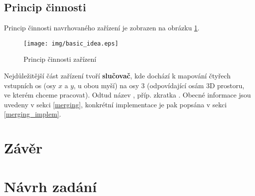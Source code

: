 \documentclass[a4paper,12pt,titlepage]{article}
\begin{document}
\subsection{Princip činnosti}

Princip činnosti navrhovaného zařízení je zobrazen na obrázku \ref{fig:basicidea}.

\begin{figure}[htb]
\centering
\texttt{[image: img/basic\_idea.eps]}
\caption{Princip činnosti zařízení}
\label{fig:basicidea}
\end{figure}

Nejdůležitější část zařízení tvoří {\bf slučovač}, kde dochází k mapování
čtyřech vstupních os (osy $x$ a $y$, u obou myší) na osy 3 (odpovídající
osám 3D prostoru, ve kterém chceme pracovat). Odtud název , příp.
zkratka .
Obecné informace jsou uvedeny v sekci \ref{merging}, konkrétní implementace
je pak popsána v sekci \ref{merging_implem}.


\clearpage





\section{Závěr}\label{conclusion}

\newpage

\appendix

\section{Návrh zadání}\label{zadani}
\end{document}
